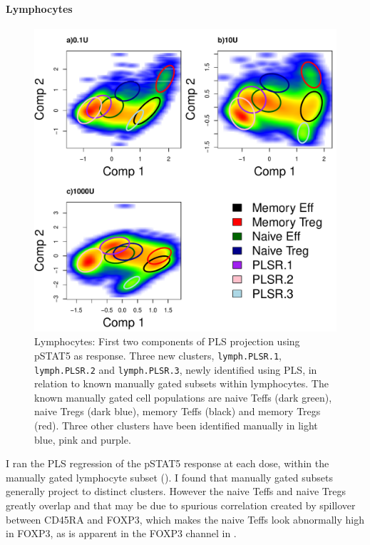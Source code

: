 \paragraph{Lymphocytes} 
\begin{figure}[!h]
\centering
\includegraphics[scale=.7]{figures/plsr-lymphocytes}
{ Lymphocytes: First two components of \gls{PLS} projection using pSTAT5 as response.}
{
Three new clusters, \texttt{lymph.PLSR.1}, \texttt{lymph.PLSR.2} and \texttt{lymph.PLSR.3}, newly identified using \gls{PLS}, in relation to known manually gated subsets within lymphocytes. 
The known manually gated cell populations are naive Teffs (dark green), naive Tregs (dark blue), memory Teffs (black) and memory Tregs (red).
Three other clusters have been identified manually in light blue, pink and purple.
} 
\end{figure}
I ran the PLS regression of the pSTAT5 response at each dose, within the manually gated lymphocyte subset ().
I found that manually gated subsets generally project to distinct clusters.
However the naive Teffs and naive Tregs greatly overlap and that may be due to spurious correlation created by
spillover between CD45RA and FOXP3, which makes the naive Teffs look abnormally high in FOXP3,
as is apparent in the FOXP3 channel in .

